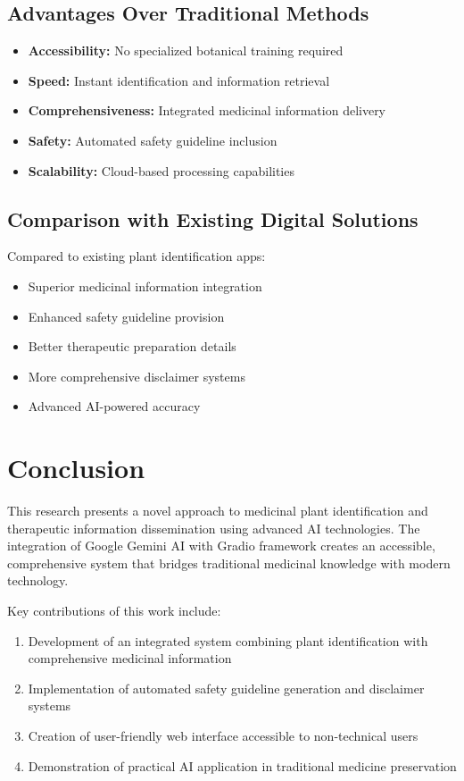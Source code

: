 \documentclass[conference]{IEEEtran}
\begin{document}
\subsection{Advantages Over Traditional Methods}

\begin{itemize}
\item \textbf{Accessibility:} No specialized botanical training required
\item \textbf{Speed:} Instant identification and information retrieval
\item \textbf{Comprehensiveness:} Integrated medicinal information delivery
\item \textbf{Safety:} Automated safety guideline inclusion
\item \textbf{Scalability:} Cloud-based processing capabilities
\end{itemize}

\subsection{Comparison with Existing Digital Solutions}

Compared to existing plant identification apps:
\begin{itemize}
\item Superior medicinal information integration
\item Enhanced safety guideline provision
\item Better therapeutic preparation details
\item More comprehensive disclaimer systems
\item Advanced AI-powered accuracy
\end{itemize}

\section{Conclusion}

This research presents a novel approach to medicinal plant identification and therapeutic information dissemination using advanced AI technologies. The integration of Google Gemini AI with Gradio framework creates an accessible, comprehensive system that bridges traditional medicinal knowledge with modern technology.

Key contributions of this work include:

\begin{enumerate}
\item Development of an integrated system combining plant identification with comprehensive medicinal information
\item Implementation of automated safety guideline generation and disclaimer systems
\item Creation of user-friendly web interface accessible to non-technical users
\item Demonstration of practical AI application in traditional medicine preservation
\end{enumerate}
\end{document}
